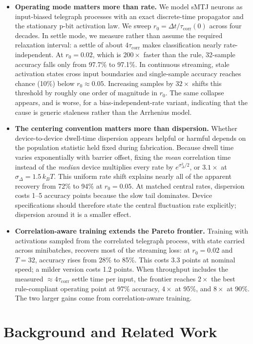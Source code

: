 \documentclass{ieeeaccess}
\newcommand{\rzero}{r_0}
\newcommand{\tauc}{\tau_{\mathrm{corr}}}
\begin{document}
\begin{itemize}
\item \textbf{Operating mode matters more than rate.} We model sMTJ
neurons as input-biased telegraph processes with an exact discrete-time
propagator and the stationary p-bit activation law. We sweep
$\rzero=\Delta t/\tauc(0)$ across four decades. In settle mode, we measure
rather than assume the required relaxation interval: a settle of about
$4\tauc$ makes classification nearly rate-independent. At $\rzero=0.02$,
which is $200\times$ faster than the rule, 32-sample accuracy falls only
from 97.7\% to 97.1\%. In continuous streaming, stale activation states
cross input boundaries and single-sample accuracy reaches chance (10\%)
below $\rzero\approx0.05$. Increasing samples by $32\times$ shifts this
threshold by roughly one order of magnitude in $\rzero$. The same collapse
appears, and is worse, for a bias-independent-rate variant, indicating that
the cause is generic staleness rather than the Arrhenius model.
\item \textbf{The centering convention matters more than dispersion.}
Whether device-to-device dwell-time dispersion appears helpful or harmful
depends on the population statistic held fixed during fabrication. Because
dwell time varies exponentially with barrier offset, fixing the \emph{mean}
correlation time instead of the \emph{median} device multiplies every rate
by $e^{\sigma_\Delta^2/2}$, or $3.1\times$ at
$\sigma_\Delta=1.5\,k_BT$. This uniform rate shift explains nearly all of
the apparent recovery from 72\% to 94\% at $\rzero=0.05$. At matched
central rates, dispersion costs 1--5 accuracy points because the slow tail
dominates. Device specifications should therefore state the central
fluctuation rate explicitly; dispersion around it is a smaller effect.
\item \textbf{Correlation-aware training extends the Pareto frontier.}
Training with activations sampled from the correlated telegraph process,
with state carried across minibatches, recovers most of the streaming loss:
at $\rzero=0.02$ and $T{=}32$, accuracy rises from 28\% to 85\%. This
costs 3.3 points at nominal speed; a milder version costs 1.2 points. When
throughput includes the measured $\approx4\tauc$ settle time per input,
the frontier reaches $2\times$ the best rule-compliant operating point at
97\% accuracy, $4\times$ at 95\%, and $8\times$ at 90\%. The two larger
gains come from correlation-aware training.
\end{itemize}

\section{Background and Related Work}
\label{sec:related}
\end{document}
